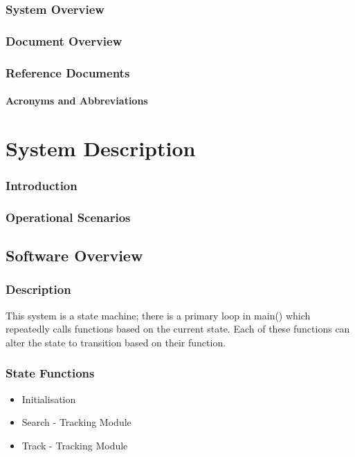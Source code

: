 \documentclass[]{report}
\begin{document}
\section{System Overview}

\section{Document Overview}

\section{Reference Documents}

\subsection{Acronyms and Abbreviations}

\part{System Description}
\section{Introduction}

\section{Operational Scenarios}

\chapter{Software Overview}
\section{Description}
This system is a state machine; there is a primary loop in main() which repeatedly calls functions based on the current state. Each of these functions can alter the state to transition based on their function.

\section{State Functions}
\begin{itemize}
	\item Initialisation
	\item Search - Tracking Module
	\item Track - Tracking Module
\end{itemize}
\end{document}

